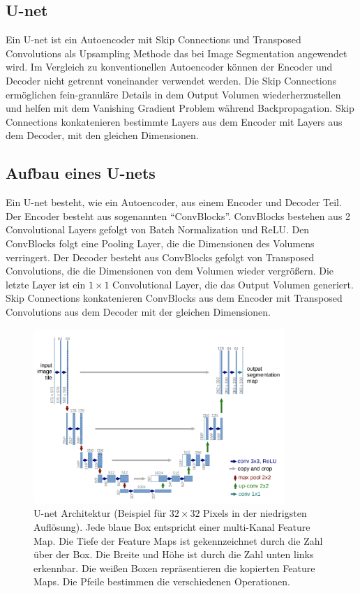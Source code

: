 \subsection{U-net}\label{section:u-net}
Ein U-net ist ein Autoencoder mit Skip Connections und Transposed Convolutions als Upsampling Methode das bei Image Segmentation angewendet wird.
Im Vergleich zu konventionellen Autoencoder können der Encoder und Decoder nicht getrennt voneinander verwendet werden. Die Skip Connections
ermöglichen fein-granuläre Details in dem Output Volumen wiederherzustellen und helfen mit dem Vanishing Gradient Problem während Backpropagation. 
Skip Connections konkatenieren bestimmte Layers aus dem Encoder mit Layers aus dem Decoder, mit den gleichen Dimensionen.
\\
\subsection{Aufbau eines U-nets}\label{section:aufbau-u-net}
Ein U-net besteht, wie ein Autoencoder, aus einem Encoder und Decoder Teil. Der Encoder besteht aus sogenannten ``ConvBlocks''. ConvBlocks
bestehen aus 2 Convolutional Layers gefolgt von Batch Normalization und ReLU. Den ConvBlocks folgt
eine Pooling Layer, die die Dimensionen des Volumens verringert. Der Decoder besteht aus ConvBlocks gefolgt von Transposed Convolutions,
die die Dimensionen von dem Volumen wieder vergrößern. Die letzte Layer ist ein $1 \times 1$ Convolutional Layer, die das Output Volumen generiert.
Skip Connections konkatenieren ConvBlocks aus dem Encoder mit Transposed Convolutions aus dem Decoder mit der gleichen Dimensionen.

\begin{figure}[H]
  \centering
  \includegraphics[width=0.85\textwidth]{resources/networks/unet.png}
  \caption{
    U-net Architektur (Beispiel für $32 \times 32$ Pixels in der niedrigsten Auflösung). Jede blaue Box entspricht einer multi-Kanal Feature Map.
    Die Tiefe der Feature Maps ist gekennzeichnet durch die Zahl über der Box. Die Breite und Höhe ist durch die Zahl unten links erkennbar.
    Die weißen Boxen repräsentieren die kopierten Feature Maps. Die Pfeile bestimmen die verschiedenen Operationen.
    \cite{ronneberger2015unet}
  }
  \label{image:unet}
\end{figure}

